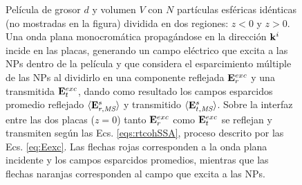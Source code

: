 \begin{figure}[h!]
\begin{tikzpicture}[scale=1]
\end{tikzpicture}
	\caption{ Película de grosor $d$ y volumen $V$ con $N$ partículas esféricas idénticas (no mostradas en la figura) dividida en dos regiones: $z<0$ y $z>0$. Una onda plana monocromática propagándose en la dirección $\vb{k}^i$ incide en las placas, generando un campo eléctrico que excita a las NPs dentro de la película y que considera el esparcimiento múltiple de las NPs al dividirlo en una componente reflejada $\vb{E}^{exc}_r$ y una transmitida $\vb{E}^{exc}_t$, dando como resultado los campos esparcidos promedio reflejado $\langle\vb{E}_{r,\textit{MS}}^s\rangle$ y transmitido $\langle\vb{E}_{t,\textit{MS}}^s\rangle$. Sobre la interfaz entre las dos placas ($z=0$) tanto $\vb{E}^{exc}_r$ como $\vb{E}^{exc}_t$ se reflejan y transmiten según las Ecs. \eqref{eqs:rtcohSSA}, proceso descrito por las Ecs. \eqref{eq:Eexc}. Las flechas rojas corresponden a la onda plana incidente y los campos esparcidos promedios, mientras que las flechas naranjas corresponden al campo que excita a las NPs. }\label{fig:Eexc}
	\end{figure}	
	
